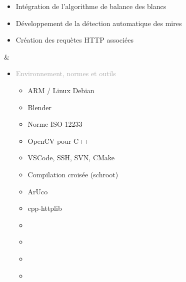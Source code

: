 \documentclass{article}
\begin{document}
\begin{tabular}
\begin{itemize}
\begin{itemize}
\begin{itemize}
                \item \textcolor{gray!80}{Intégration de l'algorithme de balance des blancs}
                \item \textcolor{gray!80}{Développement de la détection automatique des mires}
                \item \textcolor{gray!80}{Création des requètes HTTP associées}
            \end{itemize}
        \end{itemize}
    \end{itemize}
    &
    \begin{itemize}[label={}, topsep=8pt, partopsep=0pt, itemsep=0.5pt, parsep=2pt,after=\vspace*{-\baselineskip}]
        \setlength{\itemsep}{10pt} 
        \item \textcolor{darkGray}{Environnement, normes et outils} 
        \begin{itemize}
        [label={\textcolor{gray!80}{\checkmark}}, topsep=8pt, partopsep=0pt, itemsep=0.5pt, parsep=2pt] 
            \item \textcolor{gray!80}{ARM / Linux Debian}
            \item \textcolor{gray!80}{Blender}
            \item \textcolor{gray!80}{Norme ISO 12233}
            \item \textcolor{gray!80}{OpenCV pour C++}
            \item \textcolor{gray!80}{VSCode, SSH, SVN, CMake}
            \item \textcolor{gray!80}{Compilation croisée (schroot)}
            \item \textcolor{gray!80}{ArUco}
            \item \textcolor{gray!80}{cpp-httplib} 
            \item[\textcolor{white}{\checkmark}] \textcolor{gray!80}{} %
            \item[\textcolor{white}{\checkmark}] \textcolor{gray!80}{} %
            \item[\textcolor{white}{\checkmark}] \textcolor{gray!80}{} %
            \item[\textcolor{white}{\checkmark}] \textcolor{gray!80}{} %
        \end{itemize}
    \end{itemize}
\end{tabular}

\begin{center}
\end{center}
\end{document}
